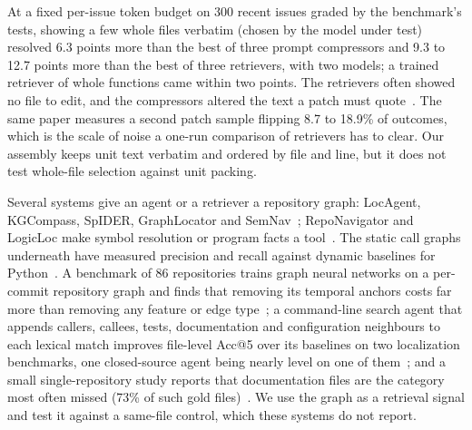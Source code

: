 \documentclass[10pt,twocolumn]{article}
\makeatletter
\renewcommand\paragraph{\@startsection{paragraph}{4}{\z@}{3pt}{-0.5em}{\normalfont\bfseries}}
\makeatother
\begin{document}
At a fixed per-issue token budget on 300 recent issues graded by the benchmark's tests, showing a few whole files verbatim (chosen by the model under test) resolved
6.3 points more than the best of three prompt compressors and 9.3 to 12.7 points more than the best of three retrievers, with two models; a
trained retriever of whole functions came within two points. The retrievers often showed no file to edit, and the compressors
altered the text a patch must quote~\cite{skipcompressor}. %
The same paper measures a second patch sample flipping 8.7 to 18.9\% of outcomes, which is the scale of noise a one-run comparison of
retrievers has to clear. %
Our assembly keeps unit text verbatim and ordered by file and line, but it does not test whole-file selection against unit packing.

\paragraph{Graph-structured localization.} Several systems give an agent or a retriever a repository
graph: LocAgent, KGCompass, SpIDER, GraphLocator and SemNav~\cite{locagent,kgcompass,spider,graphlocator,semnav};
RepoNavigator and LogicLoc make symbol resolution or program facts a tool~\cite{reponavigator,logicloc}.
The static call graphs underneath have measured precision and recall against dynamic
baselines for Python~\cite{pycg,dypybench}. A benchmark of 86 repositories trains graph neural networks on a per-commit repository graph and finds that removing its temporal
anchors costs far more than removing any feature or edge type~\cite{grepo}; %
a command-line search agent that appends callers, callees, tests, documentation and configuration neighbours to each lexical match
improves file-level Acc@5 over its baselines on two localization benchmarks, one closed-source agent being nearly level on one of them~\cite{larger}; %
and a small single-repository study reports that documentation files are the category most often missed (73\% of such gold files)~\cite{explorationstructure}. %
We use the graph as a retrieval signal and test it
against a same-file control, which these systems do not report.
\end{document}
